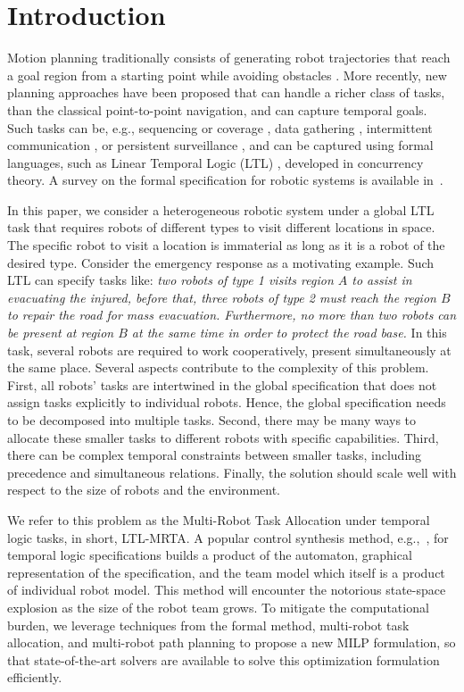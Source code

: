 \documentclass[Afour,sageh,times]{sagej}
\begin{document}
\section{Introduction}

{M}{otion} planning traditionally consists of generating robot trajectories that reach a  goal region from a starting point while avoiding obstacles \citep{lavalle2006planning}. More recently, {new planning approaches have been proposed that} can handle a richer class of tasks, than the classical point-to-point navigation, and can capture temporal goals. Such tasks can be, e.g., sequencing or coverage \citep{fainekos2005temporal}, data gathering \citep{guo2017distributed}, intermittent communication \citep{kantaros2018distributed}, or persistent surveillance \citep{leahy2016persistent}, and can be captured using formal languages, such as Linear Temporal Logic (LTL) \citep{baier2008principles},  developed in concurrency theory. A survey on the formal specification for robotic systems is available in~\cite{luckcuck2019formal}.

In this paper, we consider a heterogeneous robotic system under a global LTL task that requires robots of different types to visit different locations in space. The specific robot to visit a location is immaterial as long as it is a robot of the desired type. Consider the emergency response as a motivating example. Such LTL can specify tasks like: {\it two robots of type 1 visits region $ A $ to assist in evacuating the injured, before that, three robots of type 2 must reach the region $ B $ to repair the road for mass evacuation. Furthermore,  no more than two robots  can be present at region $B$ at the same time in order to protect the road base.} In this task, several robots are required to work cooperatively, present simultaneously at the same place. Several aspects contribute to the complexity of this problem. First, all robots' tasks are intertwined in the global specification that does not assign tasks explicitly to individual robots. Hence, the global specification needs to be decomposed into multiple tasks. Second, there may be many ways to allocate these smaller tasks to different robots with specific capabilities. Third, there can be complex temporal constraints between smaller tasks, including precedence and simultaneous relations. Finally, the solution should scale well with respect to the size of robots and the environment.


We refer to this problem as the Multi-Robot Task Allocation under temporal logic tasks, in short, LTL-MRTA. A popular control synthesis method, e.g.,~\cite{guo2015multi}, for temporal logic specifications builds a product of the automaton, graphical representation of the specification, and the team model which itself is a product of individual robot model. This method will encounter the notorious state-space explosion as the size of the robot team grows. To mitigate the computational burden, we leverage techniques from the formal method, multi-robot task allocation, and multi-robot path planning to propose a new MILP formulation, so that state-of-the-art solvers are available to solve this optimization formulation efficiently.
\end{document}

